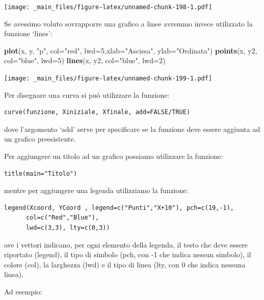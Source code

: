 \documentclass[a4paper,12pt,oneside]{book}
\newenvironment{Shaded}{\begin{snugshade}}{\end{snugshade}}
\newcommand{\KeywordTok}[1]{\textcolor[rgb]{0.13,0.29,0.53}{\textbf{#1}}}
\newcommand{\DataTypeTok}[1]{\textcolor[rgb]{0.13,0.29,0.53}{#1}}
\newcommand{\DecValTok}[1]{\textcolor[rgb]{0.00,0.00,0.81}{#1}}
\newcommand{\StringTok}[1]{\textcolor[rgb]{0.31,0.60,0.02}{#1}}
\newcommand{\NormalTok}[1]{#1}
\theoremstyle{definition}
\theoremstyle{definition}
\theoremstyle{definition}
\theoremstyle{remark}
\begin{document}
\texttt{[image: \_main\_files/figure-latex/unnamed-chunk-198-1.pdf]}

Se avessimo voluto sovrapporre una grafico a linee avremmo invece
utilizzato la funzione `lines':

\begin{Shaded}
\begin{Highlighting}[]
\KeywordTok{plot}\NormalTok{(x, y, }\StringTok{"p"}\NormalTok{, }\DataTypeTok{col=}\StringTok{"red"}\NormalTok{, }\DataTypeTok{lwd=}\DecValTok{5}\NormalTok{,}\DataTypeTok{xlab=}\StringTok{"Ascissa"}\NormalTok{, }\DataTypeTok{ylab=}\StringTok{"Ordinata"}\NormalTok{)}
\KeywordTok{points}\NormalTok{(x, y2, }\DataTypeTok{col=}\StringTok{"blue"}\NormalTok{, }\DataTypeTok{lwd=}\DecValTok{5}\NormalTok{)}
\KeywordTok{lines}\NormalTok{(x, y2, }\DataTypeTok{col=}\StringTok{"blue"}\NormalTok{, }\DataTypeTok{lwd=}\DecValTok{2}\NormalTok{)}
\end{Highlighting}
\end{Shaded}

\texttt{[image: \_main\_files/figure-latex/unnamed-chunk-199-1.pdf]}

Per disegnare una curva si può utilizzare la funzione:

\begin{verbatim}
curve(funzione, Xiniziale, Xfinale, add=FALSE/TRUE)
\end{verbatim}

dove l'argomento `add' serve per specificare se la funzione deve essere
aggiunta ad un grafico preesistente.

Per aggiungere un titolo ad un grafico possiamo utilizzare la funzione:

\begin{verbatim}
title(main="Titolo")
\end{verbatim}

mentre per aggiungere una legenda utilizziamo la funzione:

\begin{verbatim}
legend(Xcoord, YCoord , legend=c("Punti","X+10"), pch=c(19,-1),
      col=c("Red","Blue"),
      lwd=c(3,3), lty=c(0,3))
\end{verbatim}

ove i vettori indicano, per ogni elemento della legenda, il testo che
deve essere riportato (legend), il tipo di simbolo (pch, con -1 che
indica nessun simbolo), il colore (col), la larghezza (lwd) e il tipo di
linea (lty, con 0 che indica nessuna linea).

Ad esempio:
\end{document}
